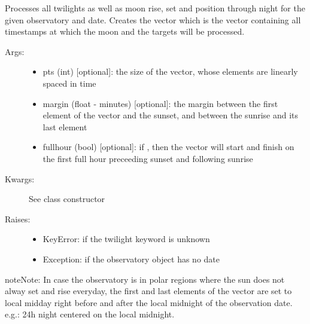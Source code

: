 \documentclass[letterpaper,10pt,english]{sphinxmanual}
\begin{document}
\begin{fulllineitems}
\begin{fulllineitems}
\end{fulllineitems}


\begin{fulllineitems}
\label{astroobs:astroobs.Observatory.Observatory.process_obs}
Processes all twilights as well as moon rise, set and position through night for the given observatory and date.
Creates the vector  which is the vector containing all timestamps at which the moon and the targets will be processed.
\begin{description}
\item[{Args:}] \leavevmode\begin{itemize}
\item {} 
pts (int) {[}optional{]}: the size of the  vector, whose elements are linearly spaced in time

\item {} 
margin (float - minutes) {[}optional{]}: the margin between the first element of the vector  and the sunset, and between the sunrise and its last element

\item {} 
fullhour (bool) {[}optional{]}: if , then the vector  will start and finish on the first full hour preceeding sunset and following sunrise

\end{itemize}

\item[{Kwargs:}] \leavevmode
See class constructor

\item[{Raises:}] \leavevmode\begin{itemize}
\item {} 
KeyError: if the twilight keyword is unknown

\item {} 
Exception: if the observatory object has no date

\end{itemize}

\end{description}

\begin{notice}{note}{Note:}
In case the observatory is in polar regions where the sun does not alway set and rise everyday, the first and last elements of the  vector are set to local midday right before and after the local midnight of the observation date. e.g.: 24h night centered on the local midnight.
\end{notice}


\end{fulllineitems}
\end{fulllineitems}
\end{document}
